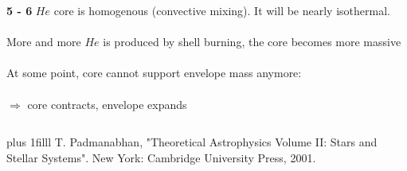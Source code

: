 \documentclass[11pt]{beamer}
\newcommand{\fillframe}{\vskip0pt plus 1filll}
\begin{document}
\begin{frame}
	\begin{columns}
		\begin{block}{\textbf{5 - 6 }}
			$He$ core is homogenous (convective mixing). It will be nearly isothermal.\\~\\
			
			More and more $He$ is produced by shell burning, the core becomes more massive \\~\\			
			
			At some point, core cannot support envelope mass anymore: \\~\\
			
			
			$\Rightarrow$ core contracts, envelope expands
		\end{block}
		\vspace{.77cm}
	\end{columns}	
	\begin{center}
		\fillframe
		\setlength{\baselineskip}{0pt}
		{\tiny
			T. Padmanabhan, "Theoretical Astrophysics Volume II: Stars and Stellar Systems". New York: Cambridge University Press, 2001.
		}
	\end{center}
\end{frame}
\end{document}

